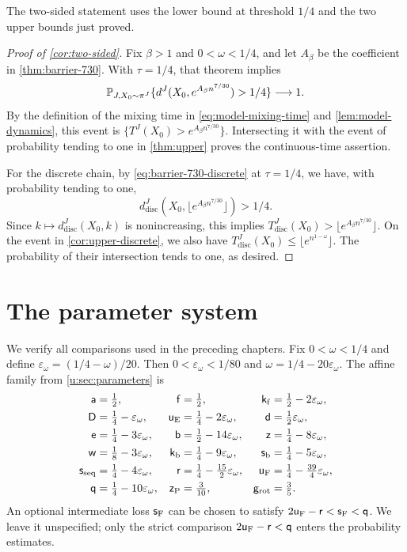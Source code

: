 The two-sided statement uses the lower bound at threshold $1/4$ and
the two upper bounds just proved.

\begin{proof}[Proof of \cref{cor:two-sided}]
Fix $\beta>1$ and $0<\omega<1/4$, and let $A_\beta$ be the coefficient
in \cref{thm:barrier-730}. With $\tau=1/4$, that theorem implies
\[
 \mathbb P_{J,X_0\sim\pi^J}
   \{d^J(X_0,e^{A_\beta n^{7/30}})>1/4\}\longrightarrow1.
\]
By the definition of the mixing time in \eqref{eq:model-mixing-time} and
\cref{lem:model-dynamics}, this event is
$\{T^J(X_0)>e^{A_\beta n^{7/30}}\}$. Intersecting it with the event
of probability tending to one in \cref{thm:upper} proves the
continuous-time assertion.

For the discrete chain, by \eqref{eq:barrier-730-discrete} at $\tau=1/4$,
we have, with probability tending to one,
\[
 d^J_{\mathrm{disc}}(X_0,\lfloor e^{A_\beta n^{7/30}}\rfloor)>1/4.
\]
Since $k\mapsto d^J_{\mathrm{disc}}(X_0,k)$ is nonincreasing, this
implies $T^J_{\mathrm{disc}}(X_0)>\lfloor e^{A_\beta n^{7/30}}\rfloor$.
On the event in \cref{cor:upper-discrete}, we also have
$T^J_{\mathrm{disc}}(X_0)\le\lfloor e^{n^{1-\omega}}\rfloor$.
The probability of their intersection tends to one, as desired.
\end{proof}

\section{The parameter system}\label{u:sec:budget}

We verify all comparisons used in the preceding chapters. Fix
$0<\omega<1/4$ and define
$\varepsilon_\omega=(1/4-\omega)/20$. Then
$0<\varepsilon_\omega<1/80$ and
$\omega=1/4-20\varepsilon_\omega$.
The affine family from \cref{u:sec:parameters} is
\begin{equation}\label{u:eq:parameter-family}
 \begin{aligned}
 \mathsf{a}&=\tfrac12,&
 \mathsf{f}&=\tfrac12,&
 \mathsf{k}_{\rm f}&=\tfrac12-2\varepsilon_\omega,\\
 \mathsf{D}&=\tfrac14-\varepsilon_\omega,&
 \mathsf{u}_{\rm E}&=\tfrac14-2\varepsilon_\omega,&
 \mathsf{d}&=\tfrac12\varepsilon_\omega,\\
 \mathsf{e}&=\tfrac14-3\varepsilon_\omega,&
 \mathsf{b}&=\tfrac12-14\varepsilon_\omega,&
 \mathsf{z}&=\tfrac14-8\varepsilon_\omega,\\
 \mathsf{w}&=\tfrac18-3\varepsilon_\omega,&
 \mathsf{k}_{\rm b}&=\tfrac14-9\varepsilon_\omega,&
 \mathsf{s}_{\rm b}&=\tfrac14-5\varepsilon_\omega,\\
 \mathsf{s}_{\rm seq}&=\tfrac14-4\varepsilon_\omega,&
 \mathsf{r}&=\tfrac14-\tfrac{15}2\varepsilon_\omega,&
 \mathsf{u}_{\rm F}&=\tfrac14-\tfrac{39}4\varepsilon_\omega,\\
 \mathsf{q}&=\tfrac14-10\varepsilon_\omega,&
 \mathsf{z}_{\rm P}&=\tfrac3{10},&
 \mathsf{g}_{\rm rot}&=\tfrac35.
 \end{aligned}
\end{equation}
An optional intermediate loss $\mathsf{s}_{\rm F}$ can be chosen to satisfy
$2\mathsf{u}_{\rm F}-\mathsf{r}<\mathsf{s}_{\rm F}<\mathsf{q}$. We leave it unspecified;
only the strict comparison $2\mathsf{u}_{\rm F}-\mathsf{r}<\mathsf{q}$ enters the
probability estimates.


